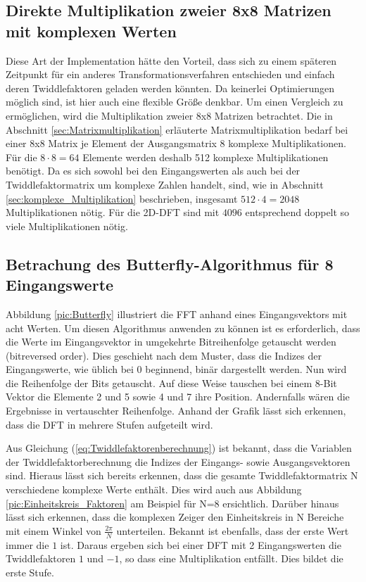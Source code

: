 \subsection{Direkte Multiplikation zweier 8x8 Matrizen mit komplexen Werten}
Diese Art der Implementation hätte den Vorteil, dass sich zu einem späteren Zeitpunkt für ein anderes
Transformationsverfahren entschieden und einfach deren Twiddlefaktoren geladen werden könnten.
Da keinerlei Optimierungen möglich sind, ist hier auch eine flexible Größe denkbar. Um einen Vergleich
zu ermöglichen, wird die Multiplikation zweier 8x8 Matrizen betrachtet.
Die in Abschnitt \ref{sec:Matrixmultiplikation} erläuterte Matrixmultiplikation bedarf bei einer 8x8 Matrix je Element der Ausgangsmatrix 8 komplexe Multiplikationen. Für
die $8\cdot8=64$ Elemente werden deshalb 512 komplexe Multiplikationen benötigt. Da es sich sowohl bei den Eingangswerten als auch bei der Twiddlefaktormatrix um komplexe
Zahlen handelt, sind, wie in Abschnitt \ref{sec:komplexe_Multiplikation} beschrieben, insgesamt $512\cdot4=2048$ Multiplikationen nötig.
Für die 2D-DFT sind mit $4096$ entsprechend doppelt so viele Multiplikationen nötig.



\subsection{Betrachung des Butterfly-Algorithmus für 8 Eingangswerte}\label{sec:AnalyseFFT}
Abbildung \ref{pic:Butterfly} illustriert die FFT anhand eines Eingangsvektors mit acht Werten. 
Um diesen Algorithmus anwenden zu können ist es erforderlich, dass die Werte im Eingangsvektor in umgekehrte Bitreihenfolge getauscht werden (bitreversed order).
Dies geschieht nach dem Muster, dass die Indizes der Eingangswerte, wie
üblich bei 0 beginnend, binär dargestellt werden. Nun wird die Reihenfolge der Bits getauscht. Auf diese Weise tauschen bei einem 8-Bit Vektor die
Elemente 2 und 5 sowie 4 und 7 ihre Position. Andernfalls wären die Ergebnisse in vertauschter Reihenfolge.
Anhand der Grafik lässt sich erkennen, dass die DFT in mehrere Stufen aufgeteilt wird.

Aus Gleichung (\ref{eq:Twiddlefaktorenberechnung}) ist 
bekannt, dass die Variablen der Twiddlefaktorberechnung die Indizes der Eingangs- sowie Ausgangsvektoren sind. Hieraus lässt sich bereits erkennen, dass
die gesamte Twiddlefaktormatrix N verschiedene komplexe Werte enthält. Dies wird auch aus Abbildung \ref{pic:Einheitskreis_Faktoren} am Beispiel für N=8 ersichtlich. 
Darüber hinaus lässt sich erkennen, dass die komplexen Zeiger den Einheitskreis 
in N Bereiche mit einem Winkel von $\frac{2 \pi}{N}$ unterteilen. Bekannt ist ebenfalls, dass der erste Wert immer die $1$ ist.
Daraus ergeben sich bei einer DFT mit 2 Eingangswerten die Twiddlefaktoren $1$ und $-1$, so dass eine Multiplikation entfällt. Dies bildet die erste Stufe.

